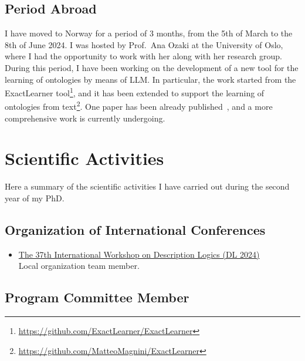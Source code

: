 \documentclass[11pt]{article}
\begin{document}
\subsection{Period Abroad}
I have moved to Norway for a period of 3 months, from the 5th of March to the 8th of June 2024.
%
I was hosted by Prof.~Ana Ozaki at the University of Oslo, where I had the opportunity to work with her along with her research group.
%
During this period, I have been working on the development of a new tool for the learning of ontologies by means of \ac{LLM}.
%
In particular, the work started from the ExactLearner tool\footnote{\url{https://github.com/ExactLearner/ExactLearner}}, and it has been extended to support the learning of ontologies from text\footnote{\url{https://github.com/MatteoMagnini/ExactLearner}}.
%
One paper has been already published~\cite{DBLP:conf/dlog/MagniniOS24}, and a more comprehensive work is currently undergoing.

\section{Scientific Activities}\label{sec:scientific-activities}
%
Here a summary of the scientific activities I have carried out during the second year of my PhD\@.

\subsection{Organization of International Conferences}\label{subsec:organization-of-international-conferences}

\begin{itemize}
	\item \href{https://dl2024.w.uib.no/organization/}{The 37th International Workshop on Description Logics (DL 2024)}
	\\Local organization team member.
\end{itemize}

\subsection{Program Committee Member}\label{subsec:program-committee-member}
\end{document}
